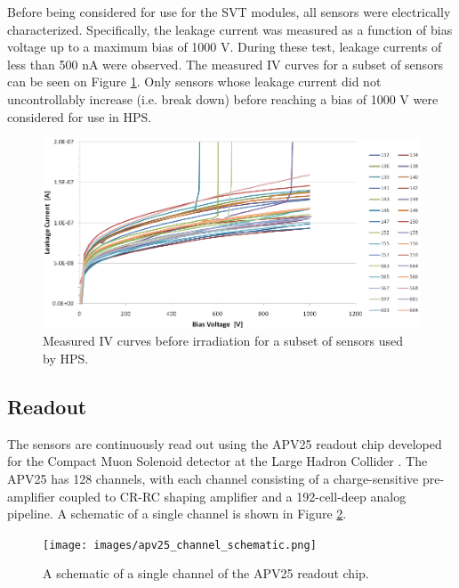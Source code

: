 Before being considered for use for the SVT modules, all sensors were electrically 
characterized.  Specifically, the leakage current was measured as a function
of bias voltage up to a maximum bias of 1000 V.  During these test, leakage 
currents of less than 500 nA were observed.  The measured IV curves for a subset
of sensors can be seen on Figure \ref{fig:sensor_iv_curves}.  Only sensors whose
leakage current did not uncontrollably increase (i.e. break down) before reaching
a bias of 1000 V  were considered for use in HPS.
\begin{figure}[t!]
    \centering
    \includegraphics[width=\textwidth]{images/sensor_iv_curves.png}
    \caption{Measured IV curves before irradiation for a subset of sensors used by HPS.}
    \label{fig:sensor_iv_curves}
\end{figure}

\subsection{Readout} \label{subsec:readout}

The sensors are continuously read out using the APV25 readout chip developed for
the Compact Muon Solenoid detector at the Large Hadron Collider 
\cite{Raymond:2000ey}. The APV25 has 128 channels, with each channel consisting
of a charge-sensitive pre-amplifier coupled to CR-RC shaping amplifier and a 
192-cell-deep analog pipeline.  A schematic of a single channel is shown in 
Figure \ref{fig:apv25_schem}.
\begin{figure}
    \centering
    \texttt{[image: images/apv25\_channel\_schematic.png]}
    \caption{A schematic of a single channel of the APV25 readout chip.}
    \label{fig:apv25_schem}
\end{figure}

